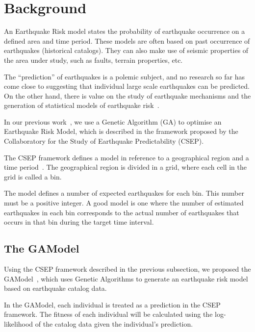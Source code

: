 \section{Background}
\label{sec:background}

An Earthquake Risk model states the probability of earthquake
occurrence on a defined area and time period. These models are often
based on past occurrence of earthquakes (historical catalogs).  They
can also make use of seismic properties of the area under study, such
as faults, terrain properties, etc.

The ``prediction'' of earthquakes is a polemic subject, and no
research so far has come close to suggesting that individual large
scale earthquakes can be predicted. On the other hand, there is value
on the study of earthquake mechanisms and the generation of
statistical models of earthquake risk~\cite{Nature1999}.

In our previous work~\cite{ecta14}, we use a Genetic Algorithm (GA) to
optimise an Earthquake Risk Model, which is described in the framework
proposed by the Collaboratory for the Study of Earthquake
Predictability (CSEP).

The CSEP framework defines a model in reference to a geographical
region and a time period~\cite{zechar2010evaluating}. The geographical
region is divided in a grid, where each cell in the grid is called a
bin.

The model defines a number of expected earthquakes for each bin.  This
number must be a positive integer. A good model is one where the
number of estimated earthquakes in each bin corresponds to the actual
number of earthquakes that occurs in that bin during the target time
interval.

\subsection{The GAModel}\label{sec:background:gamodel}

Using the CSEP framework described in the previous subsection, we
proposed the GAModel~\cite{ecta14}, which uses Genetic Algorithms to
generate an earthquake risk model based on earthquake catalog data.

In the GAModel, each individual is treated as a prediction in the CSEP
framework. The fitness of each individual will be calculated using the
log-likelihood of the catalog data given the individual's prediction.

